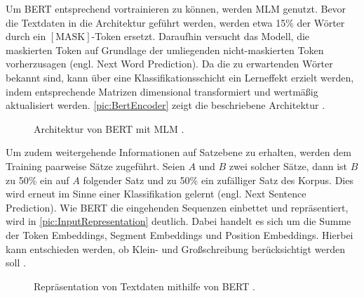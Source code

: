 \noindent
Um \ac{BERT} entsprechend vortrainieren zu können, werden \ac{MLM} genutzt. Bevor die Textdaten in die Architektur geführt werden, werden etwa 15\% der Wörter durch ein $[\text{MASK}]$-Token ersetzt. Daraufhin versucht das Modell, die maskierten Token auf Grundlage der umliegenden nicht-maskierten Token vorherzusagen (engl. Next Word Prediction). Da die zu erwartenden Wörter bekannt sind, kann über eine Klassifikationsschicht ein Lerneffekt erzielt werden, indem entsprechende Matrizen dimensional transformiert und wertmäßig aktualisiert werden. \autoref{pic:BertEncoder} zeigt die beschriebene Architektur \cite[S.~4-5]{DEV19}.\\

\begin{figure}[h!]
  \centering
  \caption{Architektur von BERT mit MLM \cite[S.~3]{DEV19}.}
  \label{pic:BertEncoder}
\end{figure}

\noindent
Um zudem weitergehende Informationen auf Satzebene zu erhalten, werden dem Training paarweise Sätze zugeführt. Seien $A$ und $B$ zwei solcher Sätze, dann ist $B$ zu 50\% ein auf $A$ folgender Satz und zu 50\% ein zufälliger Satz des Korpus. Dies wird erneut im Sinne einer Klassifikation gelernt (engl. Next Sentence Prediction). Wie \ac{BERT} die eingehenden Sequenzen einbettet und repräsentiert, wird in \autoref{pic:InputRepresentation} deutlich. Dabei handelt es sich um die Summe der Token Embeddings, Segment Embeddings und Position Embeddings. Hierbei kann entschieden werden, ob Klein- und Großschreibung berücksichtigt werden soll \cite[S.~3-5]{DEV19}.
\newpage

\begin{figure}[h!]
  \centering
  \caption{Repräsentation von Textdaten mithilfe von BERT \cite[S.~3]{DEV19}.}
  \label{pic:InputRepresentation}
\end{figure}

